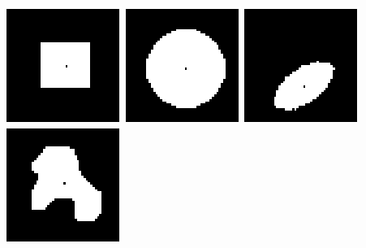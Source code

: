 \documentclass{article}
\begin{document}
\begin{center}
\includegraphics[scale=1.00]{texImgs/centroid_img2.eps}
\includegraphics[scale=1.00]{texImgs/centroid_img3.eps}
\includegraphics[scale=1.00]{texImgs/centroid_img4.eps}
\includegraphics[scale=1.00]{texImgs/centroid_img5.eps}
\end{center}
\end{document}
